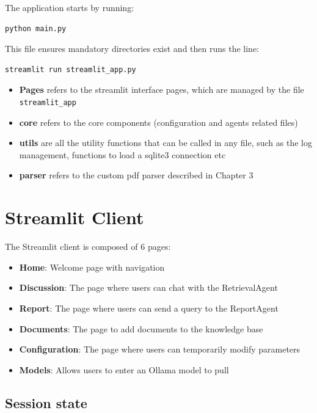 \documentclass[11pt,a4paper]{report}
\begin{document}
The application starts by running:

\begin{lstlisting}
python main.py
\end{lstlisting}

This file ensures mandatory directories exist and then runs the line:

\begin{lstlisting}
streamlit run streamlit_app.py
\end{lstlisting}

\begin{itemize}
    \item \textbf{Pages} refers to the streamlit interface pages, which are managed by the file \texttt{streamlit\_app}
    \item \textbf{core} refers to the core components (configuration and agents related files)
    \item \textbf{utils} are all the utility functions that can be called in any file, such as the log management, functions to load a sqlite3 connection etc
    \item \textbf{parser} refers to the custom pdf parser described in Chapter 3
\end{itemize}

\section{Streamlit Client}

The Streamlit client is composed of 6 pages:

\begin{itemize}
    \item \textbf{Home}: Welcome page with navigation
    \item \textbf{Discussion}: The page where users can chat with the RetrievalAgent
    \item \textbf{Report}: The page where users can send a query to the ReportAgent
    \item \textbf{Documents}: The page to add documents to the knowledge base
    \item \textbf{Configuration}: The page where users can temporarily modify parameters
    \item \textbf{Models}: Allows users to enter an Ollama model to pull
\end{itemize}

\subsection*{Session state}
\end{document}
